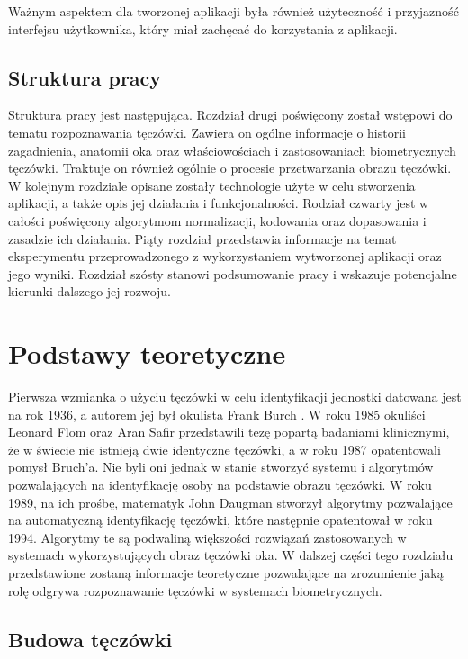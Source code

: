 \documentclass[10pt,polish,a4paper,oneside]{ppfcmthesis}
\begin{document}
\noindent
Ważnym aspektem dla tworzonej aplikacji była również użyteczność i przyjazność interfejsu użytkownika,
który miał zachęcać do korzystania z aplikacji.

\section{Struktura pracy}

Struktura pracy jest następująca. Rozdział drugi poświęcony został wstępowi do tematu
rozpoznawania tęczówki. Zawiera on ogólne informacje o historii zagadnienia, anatomii oka oraz właściowościach
i zastosowaniach biometrycznych tęczówki. Traktuje on również ogólnie o procesie
przetwarzania obrazu tęczówki. W kolejnym rozdziale opisane zostały technologie użyte w celu stworzenia
aplikacji, a także opis jej działania i funkcjonalności. Rodział czwarty jest w całości poświęcony
algorytmom normalizacji, kodowania oraz dopasowania i zasadzie ich działania. Piąty rozdział
przedstawia informacje na temat eksperymentu przeprowadzonego z wykorzystaniem wytworzonej
aplikacji oraz jego wyniki. Rozdział szósty stanowi podsumowanie pracy i wskazuje potencjalne
kierunki dalszego jej rozwoju.

 \chapter{Podstawy teoretyczne}

Pierwsza wzmianka o użyciu tęczówki w celu identyfikacji jednostki datowana jest na rok
1936, a autorem jej był okulista Frank Burch \cite{FBIGov}. W roku 1985 okuliści Leonard Flom oraz
Aran Safir przedstawili tezę popartą badaniami klinicznymi, że w świecie nie istnieją dwie
identyczne tęczówki, a w roku 1987 opatentowali pomysł Bruch'a. Nie byli oni jednak w
stanie stworzy\'c systemu i algorytmów pozwalających na identyfikację osoby na podstawie
obrazu tęczówki. W roku 1989, na ich prośbę, matematyk John Daugman stworzył algorytmy
pozwalające na automatyczną identyfikację tęczówki, które następnie opatentował w roku 1994.
\cite{Misztal2012}
Algorytmy te są podwaliną większości rozwiąza\'n zastosowanych w systemach wykorzystujących
obraz tęczówki oka. W dalszej części tego rozdziału przedstawione zostaną informacje teoretyczne
pozwalające na zrozumienie jaką rolę odgrywa rozpoznawanie tęczówki w systemach biometrycznych.

\section{Budowa tęczówki}
\end{document}
